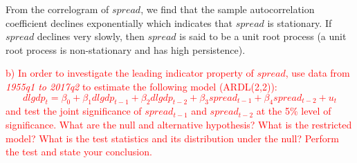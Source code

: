 \documentclass[12pt]{report}
\begin{document}
\noindent From the correlogram of $spread$, we find that the sample autocorrelation coefficient declines exponentially which indicates that $spread$ is stationary.  If $spread$ declines very slowly, then $spread$ is said to be a unit root process (a unit root process is non-stationary and has high persistence).

\noindent \textcolor{red}{b) In order to investigate the leading indicator property of $spread$, use data from \textit{1955q1 to 2017q2} to estimate the following model (ARDL(2,2)): $$dlgdp_t = \beta_0 + \beta_1dlgdp_{t-1} + \beta_2dlgdp_{t-2} + \beta_3spread_{t-1} + \beta_4spread_{t-2} + u_t$$ and test the joint significance of $spread_{t-1}$ and $spread_{t-2}$ at the 5\% level of significance. What are the null and alternative hypothesis? What is the restricted model? What is the test statistics and its distribution under the null? Perform the test and state your conclusion.}
\end{document}
